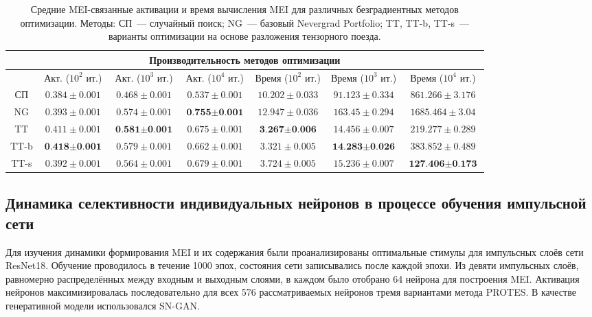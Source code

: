 \begin{table}[ht]
\scriptsize
\centering
\begin{tabular}{|c|c|c|c|c|c|c|}
 \hline
 \multicolumn{7}{|c|}{Производительность методов оптимизации} \\
 \hline
~ & Акт. ($10^2$ ит.) &Акт. ($10^3$ ит.) & Акт. ($10^4$ ит.) & Время ($10^2$ ит.) &Время ($10^3$ ит.) & Время ($10^4$ ит.)\\
 \hline
 СП & $0.384\!\pm\!0.001$ & $0.468\!\pm\!0.001$ & $0.537\!\pm\!0.001$ & $10.202\!\pm\!0.033$ & $91.123\!\pm\!0.334$ & $861.266\!\pm\!3.176$  \\
 \hline
 NG & $0.393\!\pm\!0.001$ & $0.574\!\pm\!0.001$ & $\textbf{0.755}\!\pm\!\textbf{0.001}$ & $12.947\!\pm\!0.036$ & $163.45\!\pm\!0.294$ & $1685.464\!\pm\!3.04$ \\
 \hline
 TT & $0.411\!\pm\!0.001$ & $\textbf{0.581}\!\pm\!\textbf{0.001}$ & $0.675\!\pm\!0.001$ & $\textbf{3.267}\!\pm\!\textbf{0.006}$ & $14.456\!\pm\!0.007$ & $219.277\!\pm\!0.289$\\
 \hline
 TT-b & $\textbf{0.418}\!\pm\!\textbf{0.001}$ & $0.579\!\pm\!0.001$ & $0.662\!\pm\!0.001$ & $3.321\!\pm\!0.005$ & $\textbf{14.283}\!\pm\!\textbf{0.026}$ & $383.852\!\pm\!0.489$\\
 \hline
 TT-s & $0.392\!\pm\!0.001$ & $0.564\!\pm\!0.001$ & $0.679\!\pm\!0.001$ & $3.724\!\pm\!0.005$ & $15.236\!\pm\!0.007$ & $\textbf{127.406}\!\pm\!\textbf{0.173}$\\
 \hline
\end{tabular}
\caption{Средние MEI-связанные активации и время вычисления MEI для различных безградиентных методов оптимизации. Методы: СП~--- случайный поиск; NG~--- базовый Nevergrad Portfolio; TT, TT-b, TT-s~--- варианты оптимизации на основе разложения тензорного поезда.}
\label{table:am_methods}
\end{table}


\subsection{Динамика селективности индивидуальных нейронов в процессе обучения импульсной сети}\label{sec:mango_selectivity}

Для изучения динамики формирования MEI и их содержания были проанализированы оптимальные стимулы для импульсных слоёв сети ResNet18. Обучение проводилось в течение 1000 эпох, состояния сети записывались после каждой эпохи. Из девяти импульсных слоёв, равномерно распределённых между входным и выходным слоями, в каждом было отобрано 64 нейрона для построения MEI. Активация нейронов максимизировалась последовательно для всех 576 рассматриваемых нейронов тремя вариантами метода PROTES. В качестве генеративной модели использовался SN-GAN.

